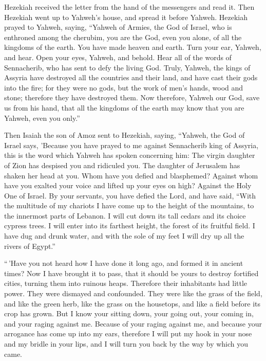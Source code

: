  Hezekiah received the letter from the hand of the
messengers and read it. Then Hezekiah went up to Yahweh's house, and
spread it before Yahweh.  Hezekiah prayed to Yahweh,
saying,  ``Yahweh of Armies, the God of Israel, who is
enthroned among the cherubim, you are the God, even you alone, of all
the kingdoms of the earth. You have made heaven and earth.
 Turn your ear, Yahweh, and hear. Open your eyes, Yahweh,
and behold. Hear all of the words of Sennacherib, who has sent to defy
the living God.  Truly, Yahweh, the kings of Assyria have
destroyed all the countries and their land,  and have
cast their gods into the fire; for they were no gods, but the work of
men's hands, wood and stone; therefore they have destroyed them.
 Now therefore, Yahweh our God, save us from his hand,
that all the kingdoms of the earth may know that you are Yahweh, even
you only.''

 Then Isaiah the son of Amoz sent to Hezekiah, saying,
``Yahweh, the God of Israel says, 'Because you have prayed to me against
Sennacherib king of Assyria,  this is the word which
Yahweh has spoken concerning him: The virgin daughter of Zion has
despised you and ridiculed you. The daughter of Jerusalem has shaken her
head at you.  Whom have you defied and blasphemed?
Against whom have you exalted your voice and lifted up your eyes on
high? Against the Holy One of Israel.  By your servants,
you have defied the Lord, and have said, ``With the multitude of my
chariots I have come up to the height of the mountains, to the innermost
parts of Lebanon. I will cut down its tall cedars and its choice cypress
trees. I will enter into its farthest height, the forest of its fruitful
field.  I have dug and drunk water, and with the sole of
my feet I will dry up all the rivers of Egypt.''

 ``\,'Have you not heard how I have done it long ago, and
formed it in ancient times? Now I have brought it to pass, that it
should be yours to destroy fortified cities, turning them into ruinous
heaps.  Therefore their inhabitants had little power.
They were dismayed and confounded. They were like the grass of the
field, and like the green herb, like the grass on the housetops, and
like a field before its crop has grown.  But I know your
sitting down, your going out, your coming in, and your raging against
me.  Because of your raging against me, and because your
arrogance has come up into my ears, therefore I will put my hook in your
nose and my bridle in your lips, and I will turn you back by the way by
which you came.

